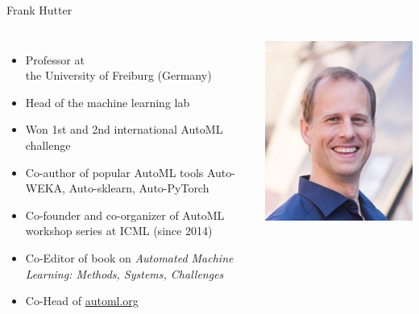 \begin{frame}[c]{Frank Hutter}

\begin{columns}
	

\begin{itemize}
	\item Professor at\\ the University of Freiburg (Germany)
	\item Head of the machine learning lab
	\item Won 1st and 2nd international AutoML challenge
	\item Co-author of popular AutoML tools Auto-WEKA, Auto-sklearn, Auto-PyTorch
	\item Co-founder and co-organizer of AutoML workshop series at ICML (since 2014)
	\item Co-Editor of book on \textit{Automated Machine Learning:	Methods, Systems, Challenges}
	\item Co-Head of \url{automl.org}
	
\end{itemize}


\includegraphics[width=1.0\textwidth]{images/hutter.jpg}
	
\end{columns}

\end{frame}
